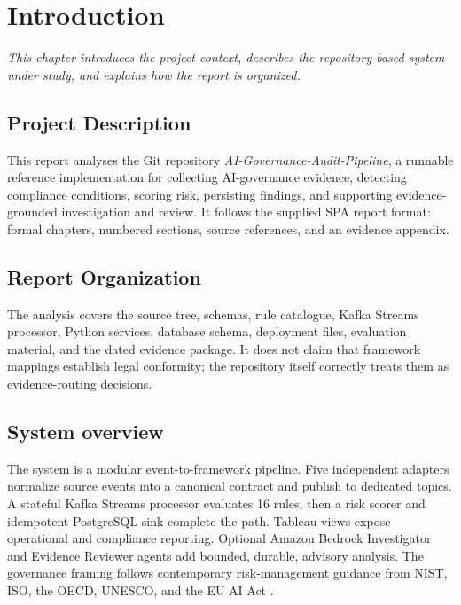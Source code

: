 \documentclass[12pt,oneside]{report}
\begin{document}
\clearpage
\tableofcontents\thispagestyle{fancy}
\clearpage
\listoftables{}
\clearpage
\listoffigures{}
\clearpage
{}\pagestyle{fancy}

\chapter{Introduction}
\noindent\textit{This chapter introduces the project context, describes the repository-based system under study, and explains how the report is organized.}\par
\section{Project Description}
This report analyses the Git repository \textit{AI-Governance-Audit-Pipeline}, a runnable reference implementation for collecting AI-governance evidence, detecting compliance conditions, scoring risk, persisting findings, and supporting evidence-grounded investigation and review. It follows the supplied SPA report format: formal chapters, numbered sections, source references, and an evidence appendix.
\section{Report Organization}
The analysis covers the source tree, schemas, rule catalogue, Kafka Streams processor, Python services, database schema, deployment files, evaluation material, and the dated evidence package. It does not claim that framework mappings establish legal conformity; the repository itself correctly treats them as evidence-routing decisions.
\section{System overview}
The system is a modular event-to-framework pipeline. Five independent adapters normalize source events into a canonical contract and publish to dedicated topics. A stateful Kafka Streams processor evaluates 16 rules, then a risk scorer and idempotent PostgreSQL sink complete the path. Tableau views expose operational and compliance reporting. Optional Amazon Bedrock Investigator and Evidence Reviewer agents add bounded, durable, advisory analysis. The governance framing follows contemporary risk-management guidance from NIST, ISO, the OECD, UNESCO, and the EU AI Act \cite{nist2023,nistgenai2024,iso42001,oecd2024,unesco2021,euaiact2024}.
\end{document}

